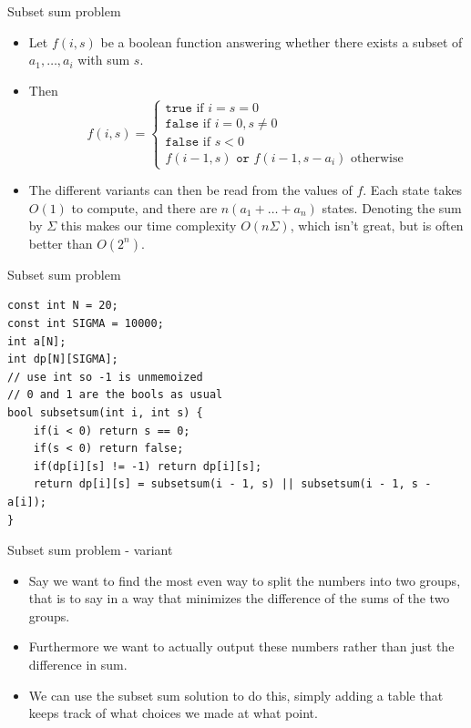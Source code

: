 \documentclass{beamer}
\begin{document}
\begin{frame}[plain]{Subset sum problem}
    \vspace{10pt}

    \begin{itemize}
        \item Let $f(i, s)$ be a boolean function answering whether there exists a subset of $a_1, \dots, a_i$ with sum $s$.
        
        \item Then      
        \[f(i, s) = \begin{cases}\texttt{true} \text{ if } i = s = 0 \\ \texttt{false} \text{ if } i = 0, s \neq 0 \\ \texttt{false} \text{ if } s < 0 \\ f(i - 1, s) \texttt{ or } f(i - 1, s - a_i) \text{ otherwise} \end{cases}\]
        
        \item The different variants can then be read from the values of $f$. Each state takes $O(1)$ to compute, and there are $n(a_1 + \dots + a_n)$ states. Denoting the sum by $\Sigma$ this makes our time complexity $O(n\Sigma)$, which isn't great, but is often better than $O(2^n)$.
    \end{itemize}
\end{frame}

\begin{frame}{Subset sum problem}
    \begin{verbatim}
const int N = 20;
const int SIGMA = 10000;
int a[N];
int dp[N][SIGMA]; 
// use int so -1 is unmemoized
// 0 and 1 are the bools as usual
bool subsetsum(int i, int s) {
    if(i < 0) return s == 0;
    if(s < 0) return false;
    if(dp[i][s] != -1) return dp[i][s];
    return dp[i][s] = subsetsum(i - 1, s) || subsetsum(i - 1, s - a[i]);
}
    \end{verbatim}
\end{frame}

\begin{frame}[plain]{Subset sum problem - variant}
    \vspace{10pt}

    \begin{itemize}
        \item Say we want to find the most even way to split the numbers into two groups, that is to say in a way that minimizes the difference of the sums of the two groups.
        
        \item Furthermore we want to actually output these numbers rather than just the difference in sum.
        
        \item We can use the subset sum solution to do this, simply adding a table that keeps track of what choices we made at what point.
    \end{itemize}
\end{frame}
\end{document}
